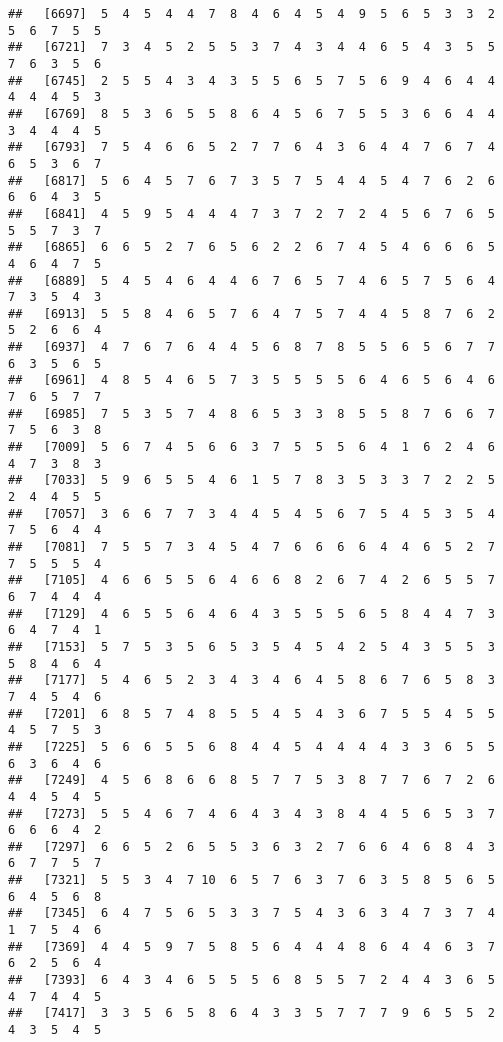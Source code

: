 \documentclass[
]{book}
\begin{document}
\begin{verbatim}
##   [6697]  5  4  5  4  4  7  8  4  6  4  5  4  9  5  6  5  3  3  2  5  6  7  5  5
##   [6721]  7  3  4  5  2  5  5  3  7  4  3  4  4  6  5  4  3  5  5  7  6  3  5  6
##   [6745]  2  5  5  4  3  4  3  5  5  6  5  7  5  6  9  4  6  4  4  4  4  4  5  3
##   [6769]  8  5  3  6  5  5  8  6  4  5  6  7  5  5  3  6  6  4  4  3  4  4  4  5
##   [6793]  7  5  4  6  6  5  2  7  7  6  4  3  6  4  4  7  6  7  4  6  5  3  6  7
##   [6817]  5  6  4  5  7  6  7  3  5  7  5  4  4  5  4  7  6  2  6  6  6  4  3  5
##   [6841]  4  5  9  5  4  4  4  7  3  7  2  7  2  4  5  6  7  6  5  5  5  7  3  7
##   [6865]  6  6  5  2  7  6  5  6  2  2  6  7  4  5  4  6  6  6  5  4  6  4  7  5
##   [6889]  5  4  5  4  6  4  4  6  7  6  5  7  4  6  5  7  5  6  4  7  3  5  4  3
##   [6913]  5  5  8  4  6  5  7  6  4  7  5  7  4  4  5  8  7  6  2  5  2  6  6  4
##   [6937]  4  7  6  7  6  4  4  5  6  8  7  8  5  5  6  5  6  7  7  6  3  5  6  5
##   [6961]  4  8  5  4  6  5  7  3  5  5  5  5  6  4  6  5  6  4  6  7  6  5  7  7
##   [6985]  7  5  3  5  7  4  8  6  5  3  3  8  5  5  8  7  6  6  7  7  5  6  3  8
##   [7009]  5  6  7  4  5  6  6  3  7  5  5  5  6  4  1  6  2  4  6  4  7  3  8  3
##   [7033]  5  9  6  5  5  4  6  1  5  7  8  3  5  3  3  7  2  2  5  2  4  4  5  5
##   [7057]  3  6  6  7  7  3  4  4  5  4  5  6  7  5  4  5  3  5  4  7  5  6  4  4
##   [7081]  7  5  5  7  3  4  5  4  7  6  6  6  6  4  4  6  5  2  7  7  5  5  5  4
##   [7105]  4  6  6  5  5  6  4  6  6  8  2  6  7  4  2  6  5  5  7  6  7  4  4  4
##   [7129]  4  6  5  5  6  4  6  4  3  5  5  5  6  5  8  4  4  7  3  6  4  7  4  1
##   [7153]  5  7  5  3  5  6  5  3  5  4  5  4  2  5  4  3  5  5  3  5  8  4  6  4
##   [7177]  5  4  6  5  2  3  4  3  4  6  4  5  8  6  7  6  5  8  3  7  4  5  4  6
##   [7201]  6  8  5  7  4  8  5  5  4  5  4  3  6  7  5  5  4  5  5  4  5  7  5  3
##   [7225]  5  6  6  5  5  6  8  4  4  5  4  4  4  4  3  3  6  5  5  6  3  6  4  6
##   [7249]  4  5  6  8  6  6  8  5  7  7  5  3  8  7  7  6  7  2  6  4  4  5  4  5
##   [7273]  5  5  4  6  7  4  6  4  3  4  3  8  4  4  5  6  5  3  7  6  6  6  4  2
##   [7297]  6  6  5  2  6  5  5  3  6  3  2  7  6  6  4  6  8  4  3  6  7  7  5  7
##   [7321]  5  5  3  4  7 10  6  5  7  6  3  7  6  3  5  8  5  6  5  6  4  5  6  8
##   [7345]  6  4  7  5  6  5  3  3  7  5  4  3  6  3  4  7  3  7  4  1  7  5  4  6
##   [7369]  4  4  5  9  7  5  8  5  6  4  4  4  8  6  4  4  6  3  7  6  2  5  6  4
##   [7393]  6  4  3  4  6  5  5  5  6  8  5  5  7  2  4  4  3  6  5  4  7  4  4  5
##   [7417]  3  3  5  6  5  8  6  4  3  3  5  7  7  7  9  6  5  5  2  4  3  5  4  5

\end{verbatim}
\end{document}

